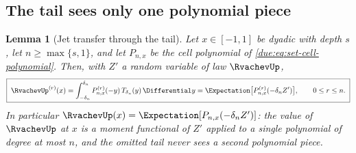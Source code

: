 \documentclass[11pt,oneside]{article}
\theoremstyle{plain}
\newtheorem{lemma}[theorem]{Lemma}
\theoremstyle{definition}
\theoremstyle{remark}
\begin{document}
\subsection{The tail sees only one polynomial piece}
\label{due:sec:set-tail-one-piece}

\begin{lemma}[Jet transfer through the tail]
\label{due:lem:set-tail-one-piece}
Let $x\in[-1,1]$ be dyadic with depth $s$, let $n\ge\max\{s,1\}$, and let
$P_{n,x}$ be the cell polynomial of \cref{due:eq:set-cell-polynomial}.
Then, with $Z'$ a random variable of law $\RvachevUp$,
\begin{equation}
 \boxed{\;
 \RvachevUp^{(r)}(x)=\int_{-\delta_n}^{\delta_n}P_{n,x}^{(r)}(-y)\,
 T_{\delta_n}(y)\,\Differential y
 =\Expectation\bigl[P_{n,x}^{(r)}(-\delta_nZ')\bigr],
 \qquad 0\le r\le n .\;}
 \label{due:eq:set-jet-transfer}
\end{equation}
In particular $\RvachevUp(x)=\Expectation[P_{n,x}(-\delta_nZ')]$: the value
of $\RvachevUp$ at $x$ is a moment functional of $Z'$ applied to a single
polynomial of degree at most $n$, and the omitted tail never sees a second
polynomial piece.
\end{lemma}
\end{document}

